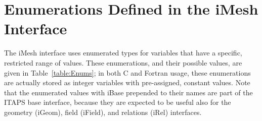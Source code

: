 \appendix

\section{Enumerations Defined in the iMesh
Interface}\label{app:ITAPS-enum} 

The iMesh interface uses enumerated types
for variables that have a specific, restricted range of values. These
enumerations, and their possible values, are given in
Table~\ref{table:Enums}; in both C and Fortran usage, these enumerations
are actually stored as integer variables with pre-assigned, constant
values. Note that the enumerated values with iBase prepended to their
names are part of the ITAPS base interface, because they are expected to
be useful also for the geometry (iGeom), field (iField), and relations
(iRel) interfaces.

